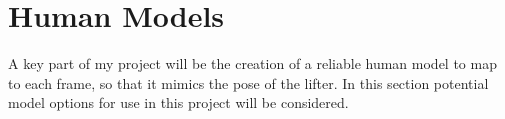 \section{Human Models}

A key part of my project will be the creation of a reliable human model to map to each frame, so that it mimics the pose of the lifter. In this section potential model options for use in this project will be considered.




